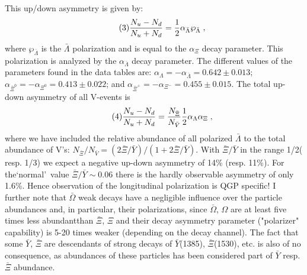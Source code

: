 \begin{mdframed}[linecolor=gray,roundcorner=12pt,backgroundcolor=Dandelion!15,linewidth=1pt,leftmargin=0cm,rightmargin=0cm,topline=true,bottomline=true,skipabove=12pt]
This up/down asymmetry is given by\footnotemark[16]: 
\begin{equation} \tag{3}
{{N_u-N_d}\over{N_u+N_d}}= {1 \over 2} \alpha_{\bar \Lambda} \wp_{\bar \Lambda}\;, 
\end{equation} 
where $\wp_{\bar \Lambda}$ is the $\bar \Lambda$ polarization and is equal to the $\alpha_\Xi$ decay parameter. This polarization is analyzed by the $\alpha_{\bar \Lambda}$ decay parameter. The different values of the parameters found in the data tables are: $\alpha_\Lambda = - \alpha_{\bar \Lambda} = 0.642 \pm 0.013$; $\alpha_{{\bar \Xi}^0}=-\alpha_{\Xi^0}= 0.413 \pm 0.022$; and $\alpha_{{\bar \Xi}^+}=-\alpha_{\Xi^-}= 0.455 \pm 0.015$. The total up-down asymmetry of all V-events is 
\begin{equation} \tag{4}
{{N_u-N_d} \over {N_u+N_d}}= {{N_{\bar \Xi}} \over {N_{\bar V}}} {1 \over 2} \alpha_\Lambda \alpha_\Xi\;, 
\end{equation} 
where we have included the relative abundance of all polarized $\bar \Lambda$ to the total abundance of V\rq s: $N_{\bar \Xi} / N_{\bar V} = (2 {\bar \Xi}/{\bar Y})/ (1+2 {\bar \Xi}/{\bar Y}).$ With $\bar \Xi/\bar Y$ in the range 1/2( resp. 1/3) we expect a negative up-down asymmetry of 14\% (resp. 11\%). For the\lq normal\rq\ value $\bar \Xi/\bar Y \sim 0.06$ there is the hardly observable asymmetry of only 1.6\%. Hence observation of the longitudinal polarization is QGP specific!  I further note that $\bar \Omega$ weak decays have a negligible influence over the particle abundances and, in particular, their polarizations, since $\bar \Omega$, $\Omega$ are at least five times less abundant\footnotemark[5] than $\bar \Xi$, $\Xi$   and their decay asymmetry parameter ("polarizer" capability) is 5-20 times weaker (depending on the decay channel). The fact that some $\bar Y$, $\bar \Xi$ are descendants of strong decays of $\bar Y$(1385), $\bar \Xi$(1530), etc. is also of no consequence, as abundances of these particles has been considered part of $\bar Y$ resp. $\bar \Xi$ abundance. 


\end{mdframed}
